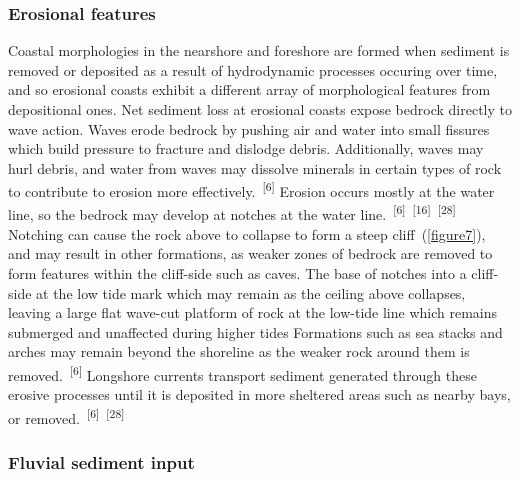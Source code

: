 \documentclass{article}
\begin{document}
\subsubsection{Erosional features}


\par{Coastal morphologies in the nearshore and foreshore are formed when sediment is removed or deposited as a result of hydrodynamic processes occuring over time, and so erosional coasts exhibit a different array of morphological features from depositional ones. Net sediment loss at erosional coasts expose bedrock directly to wave action. Waves erode bedrock by pushing air and water into small fissures which build pressure to fracture and dislodge debris. Additionally, waves may hurl debris, and water from waves may dissolve minerals in certain types of rock to contribute to erosion more effectively.~\textsuperscript{[6]} Erosion occurs mostly at the water line, so the bedrock may develop at notches at the water line.~\textsuperscript{[6]}~\textsuperscript{[16]}~\textsuperscript{[28]} Notching can cause the rock above to collapse to form a steep cliff~(\cref{figure7}), and may result in other formations, as weaker zones of bedrock are removed to form features within the cliff-side such as caves. The base of notches into a cliff-side at the low tide mark which may remain as the ceiling above collapses, leaving a large flat wave-cut platform of rock at the low-tide line which remains submerged and unaffected during higher tides Formations such as sea stacks and arches may remain beyond the shoreline as the weaker rock around them is removed.~\textsuperscript{[6]} Longshore currents transport sediment generated through these erosive processes until it is deposited in more sheltered areas such as nearby bays, or removed.~\textsuperscript{[6]}~\textsuperscript{[28]} }

\subsubsection{Fluvial sediment input}

\end{document}
